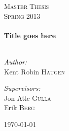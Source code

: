 \begin{titlepage}

\begin{center}



\textsc{\LARGE Master Thesis}\\[1.5cm]

\textsc{\Large Spring 2013}\\[0.5cm]


\HRule \\[0.4cm]
{ \huge \bfseries Title goes here}\\[0.4cm]

\HRule \\[1.5cm]

\begin{minipage}{0.4\textwidth}
\begin{flushleft} \large
\emph{Author:}\\
Kent Robin \textsc{Haugen}
\end{flushleft}
\end{minipage}
\begin{minipage}{0.4\textwidth}
\begin{flushright} \large
\emph{Supervisors:} \\
Jon Atle \textsc{Gulla} \\
Erik \textsc{Berg}
\end{flushright}
\end{minipage}

\vfill

{\large \today}

\end{center}

\end{titlepage}